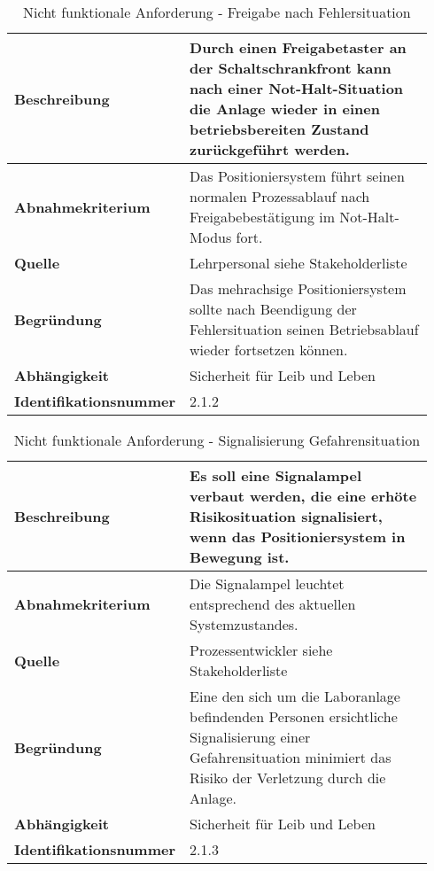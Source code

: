 \documentclass[../Bachelorarbeit.tex]{subfiles}
\begin{document}
\begin{table}[H]
    \centering
    \begin{tabular}{| p{0.34\linewidth} | p{0.6\linewidth} |}
        \hline
        \textbf{Beschreibung} & Durch einen Freigabetaster an der Schaltschrankfront kann nach einer Not-Halt-Situation die Anlage wieder in einen betriebsbereiten Zustand zurückgeführt werden. \\ \hline
        \textbf{Abnahmekriterium} & Das Positioniersystem führt seinen normalen Prozessablauf nach Freigabebestätigung im Not-Halt-Modus fort. \\ \hline
        \textbf{Quelle} & Lehrpersonal siehe Stakeholderliste \\ \hline
        \textbf{Begründung} & Das mehrachsige Positioniersystem sollte nach Beendigung der Fehlersituation seinen Betriebsablauf wieder fortsetzen können. \\ \hline
        \textbf{Abhängigkeit} & Sicherheit für Leib und Leben \\ \hline
        \textbf{Identifikationsnummer} & 2.1.2 \\ \hline
    \end{tabular}
    \caption[\acs{nfa} - Freigabe nach Fehlersituation]{Nicht funktionale Anforderung - Freigabe nach Fehlersituation}
    \label{tab:my-table12}
\end{table}

\begin{table}[H]
    \centering
    \begin{tabular}{| p{0.34\linewidth} | p{0.6\linewidth} |}
        \hline
        \textbf{Beschreibung} & Es soll eine Signalampel verbaut werden, die eine erhöte Risikosituation signalisiert, wenn das Positioniersystem in Bewegung ist. \\ \hline
        \textbf{Abnahmekriterium} & Die Signalampel leuchtet entsprechend des aktuellen Systemzustandes. \\ \hline
        \textbf{Quelle} & Prozessentwickler siehe Stakeholderliste \\ \hline
        \textbf{Begründung} & Eine den sich um die Laboranlage befindenden Personen ersichtliche Signalisierung einer Gefahrensituation minimiert das Risiko der Verletzung durch die Anlage. \\ \hline
        \textbf{Abhängigkeit} & Sicherheit für Leib und Leben \\ \hline
        \textbf{Identifikationsnummer} & 2.1.3 \\ \hline
    \end{tabular}
    \caption[\acs{nfa} - Signalisierung Gefahrensituation]{Nicht funktionale Anforderung - Signalisierung Gefahrensituation}
    \label{tab:my-table13}
\end{table}
\end{document}
